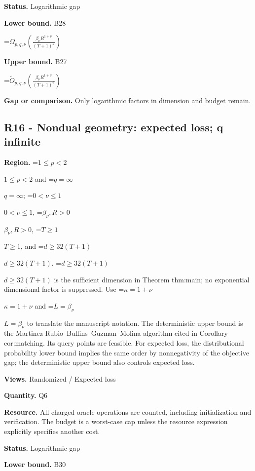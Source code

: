 \documentclass[10pt,a4paper]{article}
\newcommand{\AtlasMath}[1]{\par\begingroup\centering\setbox0=\hbox{$\displaystyle #1$}\ifdim\wd0>1.4\linewidth\typeout{ATLAS WIDE FORMULA: \the\wd0}\fi\ifdim\wd0>\linewidth\resizebox{\linewidth}{!}{\box0}\else\box0\fi\par\endgroup}
\newcommand{\AtlasInlineMath}[1]{\begingroup\setbox0=\hbox{$#1$}\ifdim\wd0>.4\linewidth\endgroup\AtlasMath{#1}\else\endgroup$#1$\fi}
\begin{document}
\textbf{Status.} Logarithmic gap



\textbf{Lower bound.} B28



\AtlasMath{\Omega_{p,q,\nu}\!\left(\frac{\beta_\nu R^{1+\nu}}{(T+1)^a}\right)}


\textbf{Upper bound.} B27



\AtlasMath{\widetilde O_{p,q,\nu}\!\left(\frac{\beta_\nu R^{1+\nu}}{(T+1)^a}\right)}


\textbf{Gap or comparison.} Only logarithmic factors in dimension and budget remain.



\subsection{R16 - Nondual geometry: expected loss; q infinite}


\textbf{Region.} \AtlasInlineMath{1\le p<2} and \AtlasInlineMath{q=\infty}; \AtlasInlineMath{0<\nu\le1}, \AtlasInlineMath{\beta_\nu,R>0}, \AtlasInlineMath{T\ge1}, and \AtlasInlineMath{d\ge32(T+1)}. \AtlasInlineMath{d\ge32(T+1)} is the sufficient dimension in Theorem thm:main; no exponential dimensional factor is suppressed. Use \AtlasInlineMath{\kappa=1+\nu} and \AtlasInlineMath{L=\beta_\nu} to translate the manuscript notation. The deterministic upper bound is the Martinez-Rubio--Bullins--Guzman--Molina algorithm cited in Corollary cor:matching. Its query points are feasible. For expected loss, the distributional probability lower bound implies the same order by nonnegativity of the objective gap; the deterministic upper bound also controls expected loss.



\textbf{Views.} Randomized / Expected loss



\textbf{Quantity.} Q6



\textbf{Resource.} All charged oracle operations are counted, including initialization and verification. The budget is a worst-case cap unless the resource expression explicitly specifies another cost.



\textbf{Status.} Logarithmic gap



\textbf{Lower bound.} B30
\end{document}
